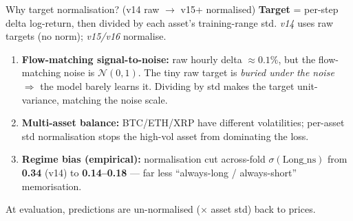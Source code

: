 \documentclass[aspectratio=169]{beamer}
\begin{document}
\begin{frame}{Why target normalisation? (v14 raw $\to$ v15+ normalised)}
\small
\textbf{Target} = per-step delta log-return, then divided by each asset's training-range std.
\emph{v14} uses raw targets (no norm); \emph{v15/v16} normalise.
\vspace{.8ex}
\begin{enumerate}
\item \textbf{Flow-matching signal-to-noise:} raw hourly delta $\approx 0.1\%$, but the flow-matching noise is $\mathcal{N}(0,1)$. The tiny raw target is \emph{buried under the noise} $\Rightarrow$ the model barely learns it. Dividing by std makes the target unit-variance, matching the noise scale.
\item \textbf{Multi-asset balance:} BTC/ETH/XRP have different volatilities; per-asset std normalisation stops the high-vol asset from dominating the loss.
\item \textbf{Regime bias (empirical):} normalisation cut across-fold $\sigma(\text{Long\_ns})$ from \textbf{0.34} (v14) to \textbf{0.14--0.18} --- far less ``always-long / always-short'' memorisation.
\end{enumerate}
\vspace{.4ex}
\footnotesize At evaluation, predictions are un-normalised ($\times$ asset std) back to prices.
\end{frame}
\end{document}
